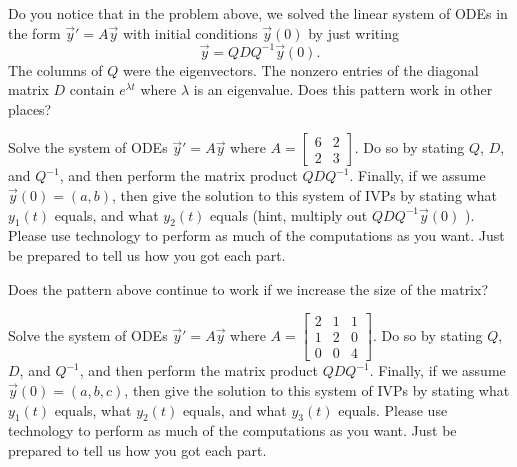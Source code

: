 Do you notice that in the problem above, we solved the linear system of ODEs in the form $\vec y' = A\vec y$  with initial conditions $\vec y(0)$ by just writing
$$\vec y = QDQ^{-1}\vec y(0).$$
The columns of $Q$ were the eigenvectors.  The nonzero entries of the diagonal matrix $D$ contain $e^{\lambda t}$ where $\lambda$ is an eigenvalue.  Does this pattern work in other places?

\begin{problem}
 Solve the system of ODEs $\vec y '=A\vec y$ where 
$A
=\begin{bmatrix}
  6&2\\2&3
 \end{bmatrix}
$. Do so by stating $Q$, $D$, and $Q^{-1}$, and then perform the matrix product $QDQ^{-1}$. Finally, if we assume $\vec y(0) = (a,b)$, then give the solution to this system of IVPs by stating what $y_1(t)$ equals, and what $y_2(t)$ equals (hint, multiply out $QDQ^{-1}\vec y(0)$  ).  Please use technology to perform as much of the computations as you want. Just be prepared to tell us how you got each part.
\end{problem}

Does the pattern above continue to work if we increase the size of the matrix?
\begin{problem}
 Solve the system of ODEs $\vec y '=A\vec y$ where 
$A
=\begin{bmatrix}
  2&1&1\\1&2&0\\0&0&4
 \end{bmatrix}
$. Do so by stating $Q$, $D$, and $Q^{-1}$, and then perform the matrix product $QDQ^{-1}$. Finally, if we assume $\vec y(0) = (a,b,c)$, then give the solution to this system of IVPs by stating what $y_1(t)$ equals, what $y_2(t)$ equals, and what $y_3(t)$ equals. Please use technology to perform as much of the computations as you want. Just be prepared to tell us how you got each part.
\end{problem}




